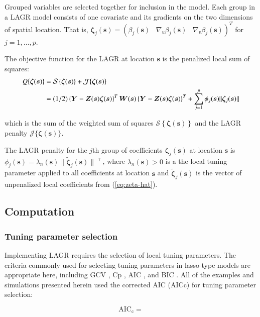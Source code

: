 \documentclass[authoryear, review, 11pt]{elsarticle}
\begin{document}
    Grouped variables are selected together for inclusion in the model. Each group in a LAGR model consists of one covariate and its gradients on the two dimensions of spatial location. That is, $\bm{\zeta}_j(\bm{s}) = \left( \beta_j(\bm{s}) \;\;\; \nabla_u \beta_j(\bm{s}) \;\;\; \nabla_v \beta_j(\bm{s}) \right)^T$ for $j=1, \dots, p$.
	
	The objective function for the LAGR at location $\bm{s}$ is the penalized local sum of squares:
	\begin{align}\label{eq:adaptive-lasso-WLS}
		Q \{ \bm{\zeta}(\bm{s}) \} &= \mathcal{S} \left\{ \bm{\zeta}( \bm{s} ) \right\} + \mathcal{J}\{ \bm{\zeta}(\bm{s}) \} \notag \\
		&= (1/2) \left\{ \bm{Y} - \bm{Z}(\bm{s}) \bm{\zeta} (\bm{s}) \right\}^T \bm{W}(\bm{s}) \left\{ \bm{Y} - \bm{Z}(\bm{s}) \bm{\zeta} (\bm{s}) \right\}^T + \sum_{j=1}^p \phi_j(\bm{s}) \| \bm{\zeta}_j(\bm{s}) \| 
	\end{align}
	
	which is the sum of the weighted sum of squares $\mathcal{S} \left\{ \bm{\zeta}( \bm{s} ) \right\}$ and the LAGR penalty $\mathcal{J}\{ \bm{\zeta}(\bm{s}) \}$.

    The LAGR penalty for the $j$th group of coefficients $\bm{\zeta}_j(\bm{s})$ at location $\bm{s}$ is $\phi_j(\bm{s}) = \lambda_n (\bm{s}) \| \tilde{\bm{\zeta}}_j(\bm{s}) \|^{-\gamma}$, where $\lambda_n (\bm{s}) > 0$ is a the local tuning parameter applied to all coefficients at location $\bm{s}$ and $\tilde{\bm{\zeta}}_j (\bm{s})$ is the vector of unpenalized local coefficients from (\ref{eq:zeta-hat}).


    \subsection{Computation}
        \subsubsection{Tuning parameter selection}
        Implementing LAGR requires the selection of local tuning parameters. The criteria commonly used for selecting tuning parameters in lasso-type models are appropriate here, including GCV \citep{Wahba:1990}, Cp \citep{Mallows-1973}, AIC \citep{Akaike-1973}, and BIC \citep{Schwartz-1978}. All of the examples and simulations presented herein used the corrected AIC (AICc) \citep{Hurvich-1998} for tuning parameter selection:

        \begin{equation}
            \text{AIC}_{\text{c}} = 
        \end{equation}
\end{document}
